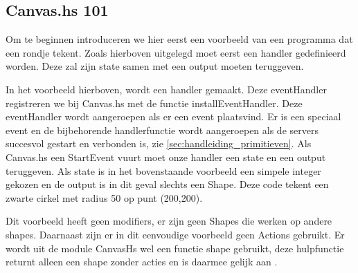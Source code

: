 \subsection{Canvas.hs 101}
Om te beginnen introduceren we hier eerst een voorbeeld van een programma dat een rondje tekent. Zoals hierboven uitgelegd moet eerst een handler gedefinieerd worden. Deze zal zijn state samen met een output moeten teruggeven.



In het voorbeeld hierboven, wordt een handler gemaakt. Deze eventHandler registreren we bij Canvas.hs met de functie installEventHandler. Deze eventHandler wordt aangeroepen als er een event plaatsvind. Er is een speciaal  event en de bijbehorende handlerfunctie wordt aangeroepen als de servers succesvol gestart en verbonden is, zie \autoref{sec:handleiding_primitieven}. Als Canvas.hs een StartEvent vuurt moet onze handler een state en een output teruggeven. Als state is in het bovenstaande voorbeeld een simpele integer gekozen en de output is in dit geval slechts een Shape. Deze code tekent een zwarte cirkel met radius 50 op punt (200,200).

Dit voorbeeld heeft geen modifiers, er zijn geen Shapes die werken op andere shapes. Daarnaast zijn er in dit eenvoudige voorbeeld geen Actions gebruikt. Er wordt uit de module CanvasHs wel een functie shape gebruikt, deze hulpfunctie returnt alleen een shape zonder acties en is daarmee gelijk aan .
